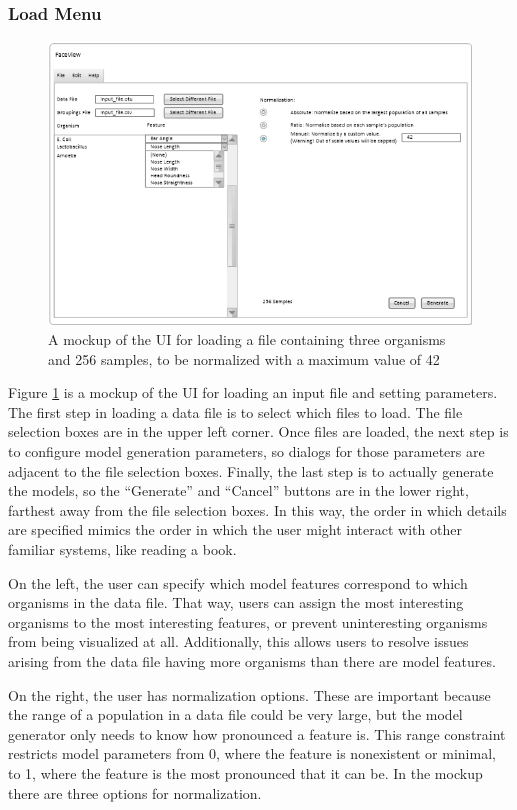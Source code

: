 \documentclass[letterpaper,10pt, onecolumn, draftclsnofoot]{IEEEtran}
\begin{document}
\subsubsection{Load Menu}
\begin{figure}[h]
	\includegraphics[width=\textwidth]{loadMenu.PNG}
	\caption{A mockup of the UI for loading a file containing three organisms and 256 samples, to be normalized with a maximum value of 42}
	\label{fig:loadingmockup}
\end{figure}

Figure \ref{fig:loadingmockup} is a mockup of the UI for loading an input file and setting parameters. The first step in loading a data file is to select which files to load. The file selection boxes are in the upper left corner. Once files are loaded, the next step is to configure model generation parameters, so dialogs for those parameters are adjacent to the file selection boxes. Finally, the last step is to actually generate the models, so the ``Generate'' and ``Cancel'' buttons are in the lower right, farthest away from the file selection boxes. In this way, the order in which details are specified mimics the order in which the user might interact with other familiar systems, like reading a book.

On the left, the user can specify which model features correspond to which organisms in the data file. That way, users can assign the most interesting organisms to the most interesting features, or prevent uninteresting organisms from being visualized at all. Additionally, this allows users to resolve issues arising from the data file having more organisms than there are model features.

On the right, the user has normalization options. These are important because the range of a population in a data file could be very large, but the model generator only needs to know how pronounced a feature is. This range constraint restricts model parameters from 0, where the feature is nonexistent or minimal, to 1, where the feature is the most pronounced that it can be. In the mockup there are three options for normalization. 
\end{document}
